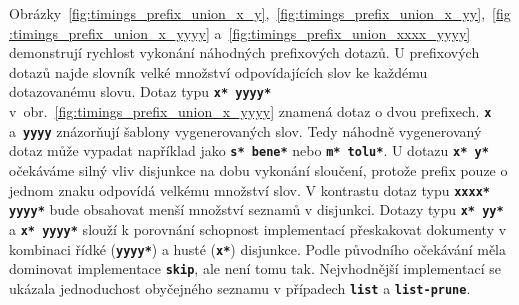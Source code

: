 \documentclass[11pt,letterpaper,oneside,openright]{book}
\newcommand{\bftt}[1]{\texttt{\textbf{#1}}}
\begin{document}
Obrázky~\ref{fig:timings_prefix_union_x_y},~\ref{fig:timings_prefix_union_x_yy},~\ref{fig:timings_prefix_union_x_yyyy}
a~\ref{fig:timings_prefix_union_xxxx_yyyy} demonstrují rychlost vykonání
náhodných prefixových dotazů. U prefixových dotazů najde slovník velké množství
odpovídajících slov ke každému dotazovanému slovu. Dotaz typu \bftt{x* yyyy*}
v~obr.~\ref{fig:timings_prefix_union_x_yyyy} znamená dotaz o dvou prefixech.
\bftt{x} a~\bftt{yyyy} znázorňují šablony vygenerovaných slov. Tedy náhodně
vygenerovaný dotaz může vypadat například jako \bftt{s* bene*} nebo \bftt{m*
tolu*}. U dotazu \bftt{x* y*} očekáváme silný vliv disjunkce na dobu vykonání
sloučení, protože prefix pouze o jednom znaku odpovídá velkému množství slov. V
kontrastu dotaz typu \bftt{xxxx* yyyy*}  bude obsahovat menší množství seznamů
v disjunkci. Dotazy typu \bftt{x* yy*} a \bftt{x* yyyy*} slouží k porovnání
schopnost implementací přeskakovat dokumenty v kombinaci řídké (\bftt{yyyy*}) a
husté (\bftt{x*}) disjunkce. Podle původního očekávání měla dominovat
implementace \bftt{skip}, ale není tomu tak. Nejvhodnější implementací se
ukázala jednoduchost obyčejného seznamu v případech \bftt{list} a
\bftt{list-prune}.
\end{document}
